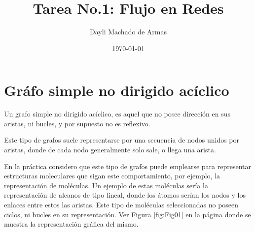 \documentclass{article}
\begin{document}
\title{Tarea No.1: Flujo en Redes}
\author{Dayli Machado de Armas}
\date{\today}
\maketitle

\section{Gráfo simple no dirigido acíclico}

Un grafo simple no dirigido acíclico, es aquel que no posee dirección en sus aristas, ni bucles, y por supuesto no es reflexivo.\cite{Elisa}

Este tipo de grafos suele representarse por una secuencia de nodos unidos por aristas, donde de cada nodo generalmente solo sale, o llega una arista.\cite{Net} 

En la práctica considero que este tipo de grafos puede emplearse para representar estructuras moleculares que sigan este comportamiento, por ejemplo, la representación de moléculas. Un ejemplo de estas moléculas sería la representación de alcanos de tipo lineal, donde los átomos serían los nodos y los enlaces entre estos las aristas. Este tipo de moléculas seleccionadas no poseen ciclos, ni bucles en su representación.  Ver Figura \ref{fig:Fig01} en la página \pageref{fig:Fig01} donde se muestra la representación gráfica del mismo. 


\end{document}
